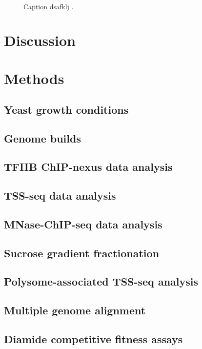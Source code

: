\begin{figure}
\caption[A figure showing DSK2 fitness competition results.]{Caption dsafklj .}
\end{figure}

\section{Discussion}

\lipsum[1]

\section{Methods}

\subsection{Yeast growth conditions}

\subsection{Genome builds}

\subsection{TFIIB ChIP-nexus data analysis}

\subsection{TSS-seq data analysis}

\subsection{MNase-ChIP-seq data analysis}

\subsection{Sucrose gradient fractionation}

\subsection{Polysome-associated TSS-seq analysis}

\subsection{Multiple genome alignment}

\subsection{Diamide competitive fitness assays}

\newpage

\begingroup
\singlespacing

\endgroup
